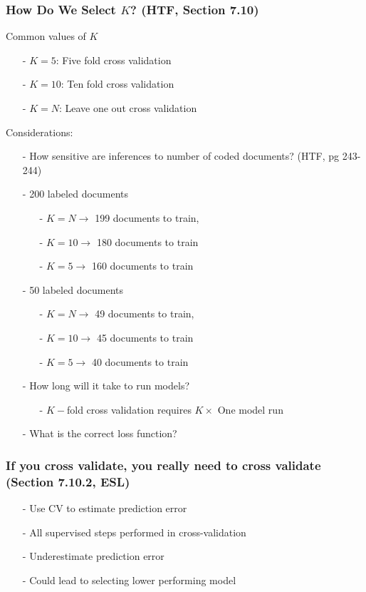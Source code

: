 \documentclass{beamer}
\numberwithin{equation}{section}
\begin{document}
\begin{frame}
\frametitle{How Do We Select $K$? (HTF, Section 7.10)  }

Common values of $K$
\begin{itemize}
\item[-] $K = 5$: Five fold cross validation
\item[-] $K = 10$: Ten fold cross validation
\item[-] $K = N $: Leave one out cross validation
\end{itemize}

Considerations:
\begin{itemize}
\item[-] How sensitive are inferences to number of coded documents? (HTF, pg 243-244)
\item[-] 200 labeled documents
\begin{itemize}
\item[-] $K= N \rightarrow$ 199 documents to train,
\item[-] $K = 10 \rightarrow$ 180 documents to train
\item[-] $K = 5 \rightarrow$ 160 documents to train
\end{itemize}
\item[-] 50 labeled documents
\begin{itemize}
\item[-] $K= N \rightarrow$ 49 documents to train,
\item[-] $K = 10 \rightarrow$ 45 documents to train
\item[-] $K = 5 \rightarrow$ 40 documents to train
\end{itemize}
\item[-] How long will it take to run models?
\begin{itemize}
\item[-] $K-$fold cross validation requires $K \times $ One model run
\end{itemize}
\item[-] What is the correct loss function?
\end{itemize}
\end{frame}


\begin{frame}
\frametitle{If you cross validate, you really need to cross validate (Section 7.10.2, ESL)}

\begin{itemize}
\item[-] Use CV to estimate prediction error
\item[-] \alert{All} supervised steps performed in cross-validation
\item[-] \alert{Underestimate} prediction error
\item[-] \alert{Could lead to selecting lower performing model}
\end{itemize}

\end{frame}
\end{document}
